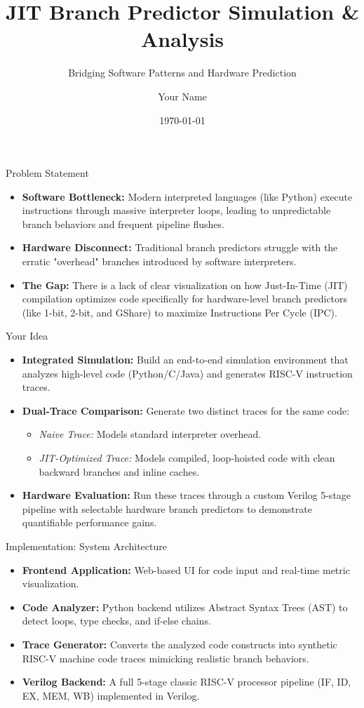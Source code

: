 \documentclass{beamer}
\title[JIT Branch Predictor]{JIT Branch Predictor Simulation \& Analysis}
\subtitle{Bridging Software Patterns and Hardware Prediction}
\author{Your Name} %
\institute{Course Name / University} %
\date{\today}
\begin{document}
\begin{frame}
  \titlepage
\end{frame}

\begin{frame}{Problem Statement}
  \begin{itemize}
    \item \textbf{Software Bottleneck:} Modern interpreted languages (like Python) execute instructions through massive interpreter loops, leading to unpredictable branch behaviors and frequent pipeline flushes.
    \item \textbf{Hardware Disconnect:} Traditional branch predictors struggle with the erratic "overhead" branches introduced by software interpreters.
    \item \textbf{The Gap:} There is a lack of clear visualization on how Just-In-Time (JIT) compilation optimizes code specifically for hardware-level branch predictors (like 1-bit, 2-bit, and GShare) to maximize Instructions Per Cycle (IPC).
  \end{itemize}
\end{frame}

\begin{frame}{Your Idea}
  \begin{itemize}
    \item \textbf{Integrated Simulation:} Build an end-to-end simulation environment that analyzes high-level code (Python/C/Java) and generates RISC-V instruction traces.
    \item \textbf{Dual-Trace Comparison:} Generate two distinct traces for the same code:
      \begin{itemize}
        \item \textit{Naive Trace:} Models standard interpreter overhead.
        \item \textit{JIT-Optimized Trace:} Models compiled, loop-hoisted code with clean backward branches and inline caches.
      \end{itemize}
    \item \textbf{Hardware Evaluation:} Run these traces through a custom Verilog 5-stage pipeline with selectable hardware branch predictors to demonstrate quantifiable performance gains.
  \end{itemize}
\end{frame}

\begin{frame}{Implementation: System Architecture}
  \begin{itemize}
    \item \textbf{Frontend Application:} Web-based UI for code input and real-time metric visualization.
    \item \textbf{Code Analyzer:} Python backend utilizes Abstract Syntax Trees (AST) to detect loops, type checks, and if-else chains.
    \item \textbf{Trace Generator:} Converts the analyzed code constructs into synthetic RISC-V machine code traces mimicking realistic branch behaviors.
    \item \textbf{Verilog Backend:} A full 5-stage classic RISC-V processor pipeline (IF, ID, EX, MEM, WB) implemented in Verilog.
  \end{itemize}
\end{frame}
\end{document}
